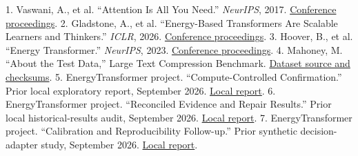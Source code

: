 \documentclass[11pt,letterpaper]{article}
\begin{document}
1. Vaswani, A., et al. “Attention Is All You Need.” \emph{NeurIPS}, 2017. \href{https://proceedings.neurips.cc/paper/2017/hash/3f5ee243547dee91fbd053c1c4a845aa-Abstract.html}{Conference proceedings}.
2. Gladstone, A., et al. “Energy-Based Transformers Are Scalable Learners and Thinkers.” \emph{ICLR}, 2026. \href{https://proceedings.iclr.cc/paper_files/paper/2026/hash/e19a65fd53b6f9a88b354da98813465d-Abstract-Conference.html}{Conference proceedings}.
3. Hoover, B., et al. “Energy Transformer.” \emph{NeurIPS}, 2023. \href{https://proceedings.neurips.cc/paper_files/paper/2023/hash/57a9b97477b67936298489e3c1417b0a-Abstract-Conference.html}{Conference proceedings}.
4. Mahoney, M. “About the Test Data,” Large Text Compression Benchmark. \href{https://mattmahoney.net/dc/textdata.html}{Dataset source and checksums}.
5. EnergyTransformer project. “Compute-Controlled Confirmation.” Prior local exploratory report, September 2026. \href{../reports/compute_confirmation/REPORT.md}{Local report}.
6. EnergyTransformer project. “Reconciled Evidence and Repair Results.” Prior local historical-results audit, September 2026. \href{../FINDINGS.md}{Local report}.
7. EnergyTransformer project. “Calibration and Reproducibility Follow-up.” Prior synthetic decision-adapter study, September 2026. \href{../../EnergyTransformer-diffusion-state/reports/sentinel\_reasoning/POLISH.md}{Local report}.
\end{document}
